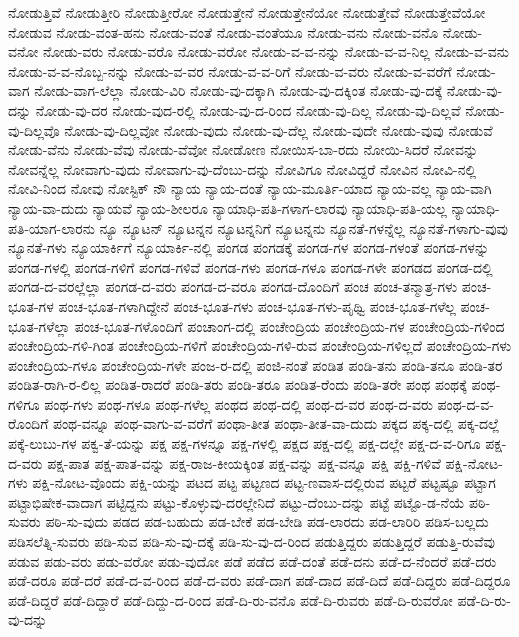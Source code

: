 {ನೋಡುತ್ತಿವೆ
ನೋಡುತ್ತೀರಿ
ನೋಡುತ್ತೀರೋ
ನೋಡುತ್ತೇನೆ
ನೋಡುತ್ತೇನೆಯೋ
ನೋಡುತ್ತೇವೆ
ನೋಡುತ್ತೇವೆಯೋ
ನೋಡುವ
ನೋಡು-ವಂತ-ಹನು
ನೋಡು-ವಂತೆ
ನೋಡು-ವಂತೆಯೂ
ನೋಡು-ವನು
ನೋಡು-ವನೊ
ನೋಡು-ವನೋ
ನೋಡು-ವರು
ನೋಡು-ವರೊ
ನೋಡು-ವರೋ
ನೋಡು-ವ-ವ-ನನ್ನು
ನೋಡು-ವ-ವ-ನಿಲ್ಲ
ನೋಡು-ವ-ವನು
ನೋಡು-ವ-ವ-ನೊಬ್ಬ-ನನ್ನು
ನೋಡು-ವ-ವರ
ನೋಡು-ವ-ವ-ರಿಗೆ
ನೋಡು-ವ-ವರು
ನೋಡು-ವ-ವರೆಗೆ
ನೋಡು-ವಾಗ
ನೋಡು-ವಾಗ-ಲೆಲ್ಲಾ
ನೋಡು-ವಿರಿ
ನೋಡು-ವು-ದಕ್ಕಾಗಿ
ನೋಡು-ವು-ದಕ್ಕಿಂತ
ನೋಡು-ವು-ದಕ್ಕೆ
ನೋಡು-ವು-ದನ್ನು
ನೋಡು-ವು-ದರ
ನೋಡು-ವುದ-ರಲ್ಲಿ
ನೋಡು-ವು-ದ-ರಿಂದ
ನೋಡು-ವು-ದಿಲ್ಲ
ನೋಡು-ವು-ದಿಲ್ಲವೆ
ನೋಡು-ವು-ದಿಲ್ಲವೊ
ನೋಡು-ವು-ದಿಲ್ಲವೋ
ನೋಡು-ವುದು
ನೋಡು-ವು-ದೆಲ್ಲ
ನೋಡು-ವುದೇ
ನೋಡು-ವುವು
ನೋಡುವೆ
ನೋಡು-ವೆನು
ನೋಡು-ವೆವು
ನೋಡು-ವೆವೋ
ನೋಡೋಣ
ನೋಯಿಸ-ಬಾ-ರದು
ನೋಯಿ-ಸಿದರೆ
ನೋವನ್ನು
ನೋವನ್ನೆಲ್ಲ
ನೋವಾಗು-ವುದು
ನೋವಾಗು-ವು-ದೆಂಬು-ದನ್ನು
ನೋವಿಗೂ
ನೋವಿದ್ದರೆ
ನೋವಿನ
ನೋವಿ-ನಲ್ಲಿ
ನೋವಿ-ನಿಂದ
ನೋವು
ನೋಸ್ಟಿಕ್
ನೌ
ನ್ಯಾಯ
ನ್ಯಾಯ-ದಂತೆ
ನ್ಯಾಯ-ಮೂರ್ತಿ-ಯಾದ
ನ್ಯಾಯ-ವಲ್ಲ
ನ್ಯಾಯ-ವಾಗಿ
ನ್ಯಾಯ-ವಾ-ದುದು
ನ್ಯಾಯವೆ
ನ್ಯಾಯ-ಶೀಲರೂ
ನ್ಯಾಯಾಧಿ-ಪತಿ-ಗಳಾಗ-ಲಾರವು
ನ್ಯಾಯಾಧಿ-ಪತಿ-ಯಲ್ಲ
ನ್ಯಾಯಾಧಿ-ಪತಿ-ಯಾಗ-ಲಾರನು
ನ್ಯೂ
ನ್ಯೂಟನ್
ನ್ಯೂಟನ್ನನ
ನ್ಯೂಟನ್ನನಿಗೆ
ನ್ಯೂಟನ್ನನು
ನ್ಯೂನತೆ-ಗಳನ್ನೆಲ್ಲ
ನ್ಯೂನತೆ-ಗಳಾಗು-ವುವು
ನ್ಯೂನತೆ-ಗಳು
ನ್ಯೂಯಾರ್ಕಿಗೆ
ನ್ಯೂಯಾರ್ಕಿ-ನಲ್ಲಿ
ಪಂಗಡ
ಪಂಗಡಕ್ಕೆ
ಪಂಗಡ-ಗಳ
ಪಂಗಡ-ಗಳಂತೆ
ಪಂಗಡ-ಗಳನ್ನು
ಪಂಗಡ-ಗಳಲ್ಲಿ
ಪಂಗಡ-ಗಳಿಗೆ
ಪಂಗಡ-ಗಳಿವೆ
ಪಂಗಡ-ಗಳು
ಪಂಗಡ-ಗಳೂ
ಪಂಗಡ-ಗಳೇ
ಪಂಗಡದ
ಪಂಗಡ-ದಲ್ಲಿ
ಪಂಗಡ-ದ-ವರಲ್ಲೆಲ್ಲಾ
ಪಂಗಡ-ದ-ವರು
ಪಂಗಡ-ದ-ವರೂ
ಪಂಗಡ-ದೊಂದಿಗೆ
ಪಂಚ
ಪಂಚ-ತನ್ಮಾತ್ರ-ಗಳು
ಪಂಚ-ಭೂತ-ಗಳ
ಪಂಚ-ಭೂತ-ಗಳಾಗಿದ್ದೇನೆ
ಪಂಚ-ಭೂತ-ಗಳು
ಪಂಚ-ಭೂತ-ಗಳು-ಪೃಥ್ವಿ
ಪಂಚ-ಭೂತ-ಗಳೆಲ್ಲ
ಪಂಚ-ಭೂತ-ಗಳೆಲ್ಲಾ
ಪಂಚ-ಭೂತ-ಗಳೊಂದಿಗೆ
ಪಂಚಾಂಗ-ದಲ್ಲಿ
ಪಂಚೇಂದ್ರಿಯ
ಪಂಚೇಂದ್ರಿಯ-ಗಳ
ಪಂಚೇಂದ್ರಿಯ-ಗಳಿಂದ
ಪಂಚೇಂದ್ರಿಯ-ಗಳಿ-ಗಿಂತ
ಪಂಚೇಂದ್ರಿಯ-ಗಳಿಗೆ
ಪಂಚೇಂದ್ರಿಯ-ಗಳಿ-ರುವ
ಪಂಚೇಂದ್ರಿಯ-ಗಳಿಲ್ಲದೆ
ಪಂಚೇಂದ್ರಿಯ-ಗಳು
ಪಂಚೇಂದ್ರಿಯ-ಗಳೂ
ಪಂಚೇಂದ್ರಿಯ-ಗಳೇ
ಪಂಜ-ರ-ದಲ್ಲಿ
ಪಂಜಿ-ನಂತೆ
ಪಂಡಿತ
ಪಂಡಿ-ತನು
ಪಂಡಿ-ತನೂ
ಪಂಡಿ-ತರ
ಪಂಡಿತ-ರಾಗಿ-ರ-ಲಿಲ್ಲ
ಪಂಡಿತ-ರಾದರೆ
ಪಂಡಿ-ತರು
ಪಂಡಿ-ತರೂ
ಪಂಡಿತ-ರೆಂದು
ಪಂಡಿ-ತರೇ
ಪಂಥ
ಪಂಥಕ್ಕೆ
ಪಂಥ-ಗಳಿಗೂ
ಪಂಥ-ಗಳು
ಪಂಥ-ಗಳೂ
ಪಂಥ-ಗಳೆಲ್ಲ
ಪಂಥದ
ಪಂಥ-ದಲ್ಲಿ
ಪಂಥ-ದ-ವರ
ಪಂಥ-ದ-ವರು
ಪಂಥ-ದ-ವ-ರೊಂದಿಗೆ
ಪಂಥ-ವನ್ನೂ
ಪಂಥ-ವಾಗು-ವ-ವರೆಗೆ
ಪಂಥಾ-ತೀತ
ಪಂಥಾ-ತೀತ-ವಾ-ದುದು
ಪಕ್ಕದ
ಪಕ್ಕ-ದಲ್ಲಿ
ಪಕ್ಕ-ದಲ್ಲೆ
ಪಕ್ಕೆ-ಲುಬು-ಗಳ
ಪಕ್ವ-ತೆ-ಯನ್ನು
ಪಕ್ಷ
ಪಕ್ಷ-ಗಳನ್ನೂ
ಪಕ್ಷ-ಗಳಲ್ಲಿ
ಪಕ್ಷದ
ಪಕ್ಷ-ದಲ್ಲಿ
ಪಕ್ಷ-ದಲ್ಲೇ
ಪಕ್ಷ-ದ-ವ-ರಿಗೂ
ಪಕ್ಷ-ದ-ವರು
ಪಕ್ಷ-ಪಾತ
ಪಕ್ಷ-ಪಾತ-ವನ್ನು
ಪಕ್ಷ-ರಾಜ-ಕೀಯಕ್ಕಿಂತ
ಪಕ್ಷ-ವನ್ನು
ಪಕ್ಷ-ವನ್ನೂ
ಪಕ್ಷಿ
ಪಕ್ಷಿ-ಗಳಿವೆ
ಪಕ್ಷಿ-ನೋಟ-ಗಳು
ಪಕ್ಷಿ-ನೋಟ-ವೊಂದು
ಪಕ್ಷಿ-ಯನ್ನು
ಪಟದ
ಪಟ್ಟ
ಪಟ್ಟಣದ
ಪಟ್ಟ-ಣವಾಸ-ದಲ್ಲಿರುವ
ಪಟ್ಟರೆ
ಪಟ್ಟಷ್ಟೂ
ಪಟ್ಟಾಗ
ಪಟ್ಟಾಭಿಷೇಕ-ವಾದಾಗ
ಪಟ್ಟಿದ್ದನು
ಪಟ್ಟು-ಕೊಳ್ಳುವು-ದರಲ್ಲೇನಿದೆ
ಪಟ್ಟು-ದೆಂಬು-ದನ್ನು
ಪಟ್ಟೆ
ಪಟ್ಟೊ-ಡ-ನೆಯೆ
ಪಠಿ-ಸುವರು
ಪಠಿ-ಸು-ವುದು
ಪಡದ
ಪಡ-ಬಹುದು
ಪಡ-ಬೇಕೆ
ಪಡ-ಬೇಡಿ
ಪಡ-ಲಾರದು
ಪಡ-ಲಾರಿರಿ
ಪಡಿಸ-ಬಲ್ಲದು
ಪಡಿಸಲೆತ್ನಿ-ಸುವರು
ಪಡಿ-ಸುವ
ಪಡಿ-ಸು-ವು-ದಕ್ಕೆ
ಪಡಿ-ಸು-ವು-ದ-ರಿಂದ
ಪಡುತ್ತಿದ್ದರು
ಪಡುತ್ತಿದ್ದರೆ
ಪಡುತ್ತಿ-ರುವೆವು
ಪಡುವ
ಪಡು-ವರು
ಪಡು-ವರೋ
ಪಡು-ವುದೋ
ಪಡೆ
ಪಡೆದ
ಪಡೆ-ದಂತೆ
ಪಡೆ-ದನು
ಪಡೆ-ದ-ನೆಂದರೆ
ಪಡೆ-ದರು
ಪಡೆ-ದರೂ
ಪಡೆ-ದರೆ
ಪಡೆ-ದ-ವ-ರಿಂದ
ಪಡೆ-ದ-ವರು
ಪಡೆ-ದಾಗ
ಪಡೆ-ದಾದ
ಪಡೆ-ದಿದೆ
ಪಡೆ-ದಿದ್ದರು
ಪಡೆ-ದಿದ್ದರೂ
ಪಡೆ-ದಿದ್ದರೆ
ಪಡೆ-ದಿದ್ದಾರೆ
ಪಡೆ-ದಿದ್ದು-ದ-ರಿಂದ
ಪಡೆ-ದಿ-ರು-ವನೊ
ಪಡೆ-ದಿ-ರುವರು
ಪಡೆ-ದಿ-ರುವರೋ
ಪಡೆ-ದಿ-ರು-ವು-ದನ್ನು
}
